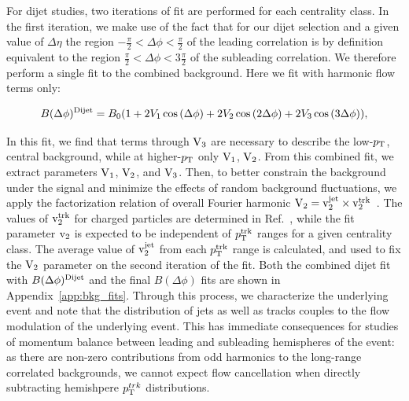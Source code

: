 For dijet studies, two iterations of fit are performed for each centrality class. In the first iteration, we make use of the fact that for our dijet selection and a given value of $\Delta\eta$ the region $-\frac{\pi}{2}<\Delta\phi<\frac{\pi}{2}$ of the leading correlation is by definition equivalent to the region $\frac{\pi}{2}<\Delta\phi<3\frac{\pi}{2}$ of the subleading correlation.  We therefore perform a single fit to the combined background.  Here we fit with harmonic flow terms only:  

\begin{equation}
\label{eq:bkg_fit_dijet}
B(\Delta\phi)^{\rm Dijet} = B_{0}(1+2V_{\rm1}\cos{(\Delta\phi)}+2V_{\rm 2}\cos{(2\Delta\phi)}+2V_{\rm 3}\cos{(3\Delta\phi)}),
\end{equation}

In this fit, we find that terms through $\rm V_{3}$ are necessary to describe the low-$p_{\rm T}$, central background, while at higher-$p_{\rm T}$ only $\rm V_{1}$, $\rm V_ {2}$.  From this combined fit, we extract parameters $\rm V_{1}$, $\rm V_ {2}$, and $\rm V_{3}$.  Then, to better constrain the background under the signal and minimize the effects of random background fluctuations, we apply the factorization relation of overall Fourier harmonic $\rm V_{2} = v_{2}^{jet} \times v_{2}^{trk}$~\cite{Aamodt:2011by, Chatrchyan:2011eka}. The values of $\rm v_{2}^{trk}$ for charged particles are determined in Ref.~\cite{Chatrchyan:2012wg}, while the fit parameter $\rm v_{2}$ is expected to be independent of  $p_{\rm T}^{\rm trk}$ ranges for a given centrality class.  The average value of $\rm v_{2}^{jet}$ from each $p_{\rm T}^{\rm trk}$ range is calculated, and used to fix the $\rm V_{2}$ parameter on the second iteration of the fit.  Both the combined dijet fit with $B(\Delta\phi)^{\rm Dijet}$ and the final $B(\Delta\phi)$ fits are shown in Appendix~\ref{app:bkg_fits}.  Through this process, we characterize the underlying event and note that the distribution of jets as well as tracks couples to the flow modulation of the underlying event.  This has immediate consequences for studies of momentum balance between leading and subleading hemispheres of the event:  as there are non-zero contributions from odd harmonics to the long-range correlated backgrounds, we cannot expect flow cancellation when directly subtracting hemishpere $p_{\rm T}^{trk}$ distributions.  

